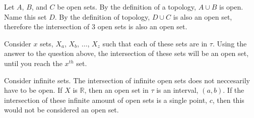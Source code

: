 \documentclass{report}
\begin{document}
\sol Let $A$, $B$, and $C$ be open sets. By the definition of a topology, $A \cup B$ is open. Name this set $D$. By the definition of topology, $D \cup C$ is also an open set, therefore the intersection of $3$ open sets is also an open set. 

\sol Consider $x$ sets, $X_a$, $X_b$, $\dots$, $X_z$ such that each of these sets are in $\tau$. Using the answer to the question above, the intersection of these sets will be an open set, until you reach the $x^{th}$ set. 

\sol Consider infinite sets. The intersection of infinite open sets does not neccesarily have to be open. If $X$ is $\mathbb{R}$, then an open set in $\tau$ is an interval, $(a, b)$. If the intersection of these infinite amount of open sets is a single point, ${c}$, then this would not be considered an open set. 
\end{document}
